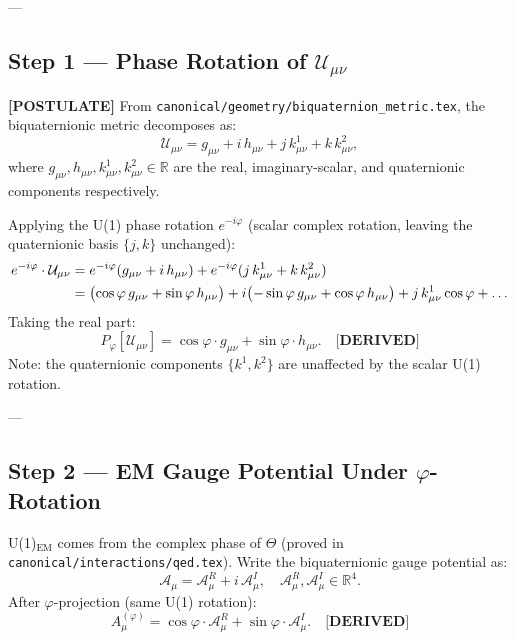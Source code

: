 ---

\subsection{Step 1 — Phase Rotation of $\mathcal{U}_{\mu\nu}$}
\label{sec:phi_step1}

\textbf{[POSTULATE]} From \texttt{canonical/geometry/biquaternion\_metric.tex},
the biquaternionic metric decomposes as:
\begin{equation}
  \mathcal{U}_{\mu\nu} = g_{\mu\nu} + i\,h_{\mu\nu} + j\,k^1_{\mu\nu} + k\,k^2_{\mu\nu},
  \label{eq:biq_metric_decomp}
\end{equation}
where $g_{\mu\nu}, h_{\mu\nu}, k^1_{\mu\nu}, k^2_{\mu\nu} \in \mathbb{R}$ are the real,
imaginary-scalar, and quaternionic components respectively.

Applying the U(1) phase rotation $e^{-i\varphi}$ (scalar complex rotation,
leaving the quaternionic basis $\{j, k\}$ unchanged):
\begin{align}
  e^{-i\varphi} \cdot \mathcal{U}_{\mu\nu}
  &= e^{-i\varphi}(g_{\mu\nu} + i\,h_{\mu\nu}) + e^{-i\varphi}(j\,k^1_{\mu\nu} + k\,k^2_{\mu\nu})
  \notag\\
  &= \bigl(\cos\varphi\,g_{\mu\nu} + \sin\varphi\,h_{\mu\nu}\bigr)
   + i\bigl(-\sin\varphi\,g_{\mu\nu} + \cos\varphi\,h_{\mu\nu}\bigr)
   + j\,k^1_{\mu\nu}\cos\varphi + \ldots
\end{align}
Taking the real part:
\begin{equation}
  \boxed{P_\varphi[\mathcal{U}_{\mu\nu}]
    = \cos\varphi \cdot g_{\mu\nu} + \sin\varphi \cdot h_{\mu\nu}.}
  \label{eq:proj_result}
  \quad \textbf{[DERIVED]}
\end{equation}
Note: the quaternionic components $\{k^1, k^2\}$ are unaffected by the scalar U(1) rotation.

---

\subsection{Step 2 — EM Gauge Potential Under $\varphi$-Rotation}
\label{sec:phi_step2}

U(1)$_\mathrm{EM}$ comes from the complex phase of $\Theta$ (proved in
\texttt{canonical/interactions/qed.tex}).  Write the biquaternionic gauge potential as:
\begin{equation}
  \mathcal{A}_\mu = \mathcal{A}^R_\mu + i\,\mathcal{A}^I_\mu, \quad
  \mathcal{A}^R_\mu, \mathcal{A}^I_\mu \in \mathbb{R}^4.
\end{equation}
After $\varphi$-projection (same U(1) rotation):
\begin{equation}
  A^{(\varphi)}_\mu = \cos\varphi \cdot \mathcal{A}^R_\mu + \sin\varphi \cdot \mathcal{A}^I_\mu.
  \label{eq:A_phi}
  \quad \textbf{[DERIVED]}
\end{equation}

